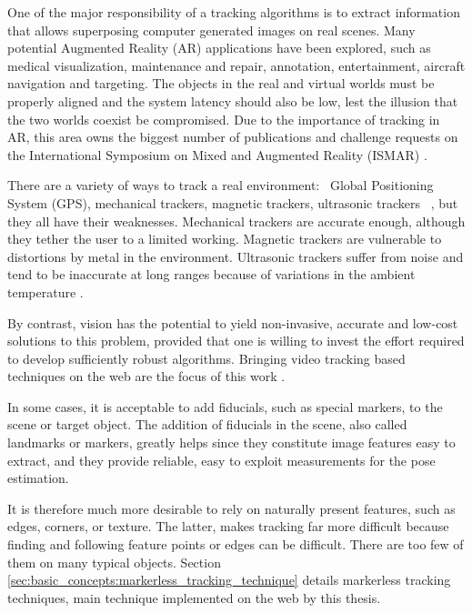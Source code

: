 One of the major responsibility of a tracking algorithms is to extract information that allows superposing computer generated images on real scenes. Many potential Augmented Reality (AR) applications have been explored, such as medical visualization, maintenance and repair, annotation, entertainment, aircraft navigation and targeting. The objects in the real and virtual worlds must be properly aligned and the system latency should also be low, lest the illusion that the two worlds coexist be compromised. \cite{Lepetit2005} Due to the importance of tracking in AR, this area owns the biggest number of publications and challenge requests on the International Symposium on Mixed and Augmented Reality (ISMAR) \cite{Zhou2008}.

There are a variety of ways to track a real environment: \eg\ Global Positioning System (GPS), mechanical trackers, magnetic trackers, ultrasonic trackers \etc\ \cite{Krevelen2010}, but they all have their weaknesses. Mechanical trackers are accurate enough, although they tether the user to a limited working. Magnetic trackers are vulnerable to distortions by metal in the environment. Ultrasonic trackers suffer from noise and tend to be inaccurate at long ranges because of variations in the ambient temperature \cite{Lepetit2005}.

By contrast, vision has the potential to yield non-invasive, accurate and low-cost solutions to this problem, provided that one is willing to invest the effort required to develop sufficiently robust algorithms. Bringing video tracking based techniques on the web are the focus of this work \cite{Lepetit2005}.

In some cases, it is acceptable to add fiducials, such as special markers, to the scene or target object. The addition of fiducials in the scene, also called landmarks or markers, greatly helps since they constitute image features easy to extract, and they provide reliable, easy to exploit measurements for the pose estimation.

It is therefore much more desirable to rely on naturally present features, such as edges, corners, or texture. The latter, makes tracking far more difficult because finding and following feature points or edges can be difficult. There are too few of them on many typical objects. Section \ref{sec:basic_concepts:markerless_tracking_technique} details markerless tracking techniques, main technique implemented on the web by this thesis.


